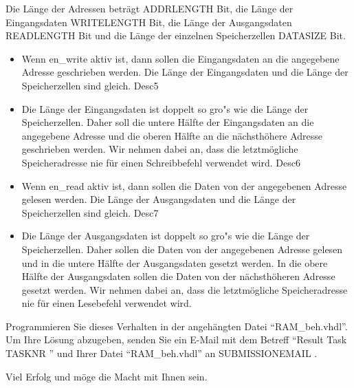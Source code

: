 \documentclass[a4paper,12pt]{article}
\begin{document}
Die L\"ange der Adressen betr\"agt {{ADDRLENGTH}} Bit, die L\"ange der Eingangsdaten {{WRITELENGTH}} Bit, die L\"ange der Ausgangsdaten {{READLENGTH}} Bit und die L\"ange der einzelnen Speicherzellen {{DATASIZE}} Bit.
\begin{itemize}
{{Desc4}}\item Wenn en\_write aktiv ist, dann sollen die Eingangsdaten an die angegebene Adresse geschrieben werden. Die L\"ange der Eingangsdaten und die L\"ange der Speicherzellen sind gleich.
{{Desc5}}\item Die L\"ange der Eingangsdaten ist doppelt so gro"s wie die L\"ange der Speicherzellen. Daher soll die untere H\"alfte der Eingangsdaten an die angegebene Adresse und die oberen H\"alfte an die n\"achsth\"ohere Adresse geschrieben werden. Wir nehmen dabei an, dass die letztm\"ogliche Speicheradresse nie f\"ur einen Schreibbefehl verwendet wird.
{{Desc6}}\item Wenn en\_read aktiv ist, dann sollen die Daten von der angegebenen Adresse gelesen werden. Die L\"ange der Ausgangsdaten und die L\"ange der Speicherzellen sind gleich.
{{Desc7}}\item Die L\"ange der Ausgangsdaten ist doppelt so gro"s wie die L\"ange der Speicherzellen. Daher sollen die Daten von der angegebenen Adresse gelesen und in die untere H\"alfte der Ausgangsdaten gesetzt werden. In die obere H\"alfte der Ausgangsdaten sollen die Daten von der n\"achsth\"oheren Adresse gesetzt werden. Wir nehmen dabei an, dass die letztm\"ogliche Speicheradresse nie f\"ur einen Lesebefehl verwendet wird.
\end{itemize}

\vspace{0.7cm}

Programmieren Sie dieses Verhalten in der angeh\"angten Datei "`RAM\_beh.vhdl"'.\\

Um Ihre L\"osung abzugeben, senden Sie ein E-Mail mit dem Betreff "`Result Task {{ TASKNR }}"' und Ihrer Datei "`RAM\_beh.vhdl"'  an {{ SUBMISSIONEMAIL }}.

\vspace{0.7cm}

Viel Erfolg und m\"oge die Macht mit Ihnen sein.
\end{document}
